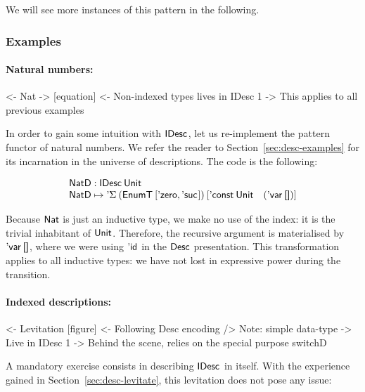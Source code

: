 We will see more instances of this pattern in the following.




\subsubsection{Examples}
\label{sec:idesc-examples}

\paragraph{Natural numbers:}

\begin{wstructure}
<- Nat
    -> [equation]
    <- Non-indexed types lives in IDesc 1
        -> This applies to all previous examples
\end{wstructure}

In order to gain some intuition with $\IDesc{\!}$, let us re-implement
the pattern functor of natural numbers. We refer the reader to
Section~\ref{sec:desc-examples} for its incarnation in the universe of
descriptions. The code is the following:

\[\stk{
\NatD : \IDesc{\Unit} \\
\NatD \mapsto \DSigma{(\EnumT{[ \NatZero, \NatSuc{\!} ]})}
                     {[ \DConst{\Unit} \quad (\DVar{\Void}) ]}
}\]

Because $\Nat$ is just an inductive type, we make no use of the index:
it is the trivial inhabitant of $\Unit$. Therefore, the recursive
argument is materialised by $\DVar{\Void}$, where we were using $\DId$
in the $\Desc$ presentation. This transformation applies to all
inductive types: we have not lost in expressive power during the
transition.

\paragraph{Indexed descriptions:}

\begin{wstructure}
<- Levitation [figure]
    <- Following Desc encoding
        /> Note: simple data-type
            -> Live in IDesc 1
    -> Behind the scene, relies on the special purpose switchD
\end{wstructure}

A mandatory exercise consists in describing $\IDesc{\!}$ in itself. With
the experience gained in Section~\ref{sec:desc-levitate}, this
levitation does not pose any issue:

